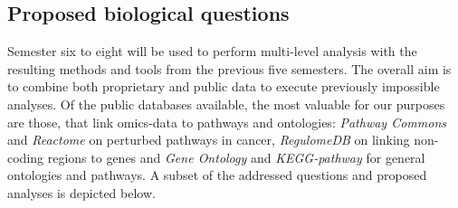 \documentclass[twoside,fontsize=10pt]{article}
\begin{document}
\subsection*{Proposed biological questions}
Semester six to eight will be used to perform multi-level analysis with the resulting methods and tools from the previous five semesters. The overall aim is to combine both proprietary and public data to execute previously impossible analyses. Of the public databases available, the most valuable for our purposes are those, that link omics-data to pathways and ontologies: \textit{Pathway Commons}\cite{Cerami2011} and \textit{Reactome}\cite{Jupp2014} on perturbed pathways in cancer, \textit{RegulomeDB}\cite{Boyle2012} on linking non-coding regions to genes and \textit{Gene Ontology}\cite{Ashburner2000} and \textit{KEGG-pathway}\cite{Kanehisa2000} for general ontologies and pathways. A subset of the addressed questions and proposed analyses is depicted below.
\renewcommand{\labelenumi}{\roman{enumi}.}
\end{document}
